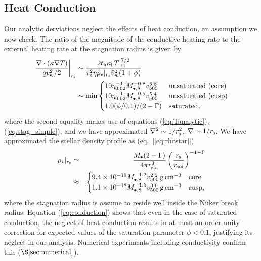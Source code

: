 \documentclass[usenatbib,fleqn]{mn2e}
\begin{document}
\subsection{Heat Conduction}
\label{sec:conductivity}

Our analytic derviations neglect the effects of heat conduction, an assumption we now check.  The ratio of the magnitude of the conductive heating rate to the external heating rate at the stagnation radius is given by
\begin{align}
  \left.\frac{\nabla\cdot(\kappa \nabla T)}{q v_{\rm
w}^{2}/2}\right|_{r_{\rm s}} &\sim \frac{2t_{\rm h}\kappa_0
T|_{r_{\rm s}}^{7/2}}{r_{\rm s}^{2}\eta \rho_{\star}|_{r_{\rm s}} \tilde{v}_{w}^{2}(1+\phi)}
\nonumber \\ &\sim {\rm min}
  \begin{cases}
  10 \eta_{0.02}^{-1}
M_{\bullet,8}^{-0.8} v_{500}^{6.8} &  \text{unsaturated (core)}\\
 10 \eta_{0.02}^{-1}
M_{\bullet,8}^{-0.5} v_{500}^{5.4} &  \text{unsaturated (cusp)}\\
  1.0(\phi/0.1)/(2-\Gamma) & \text{saturated},
  \end{cases}
 \label{eq:conduction}
\end{align}
where the second equality makes use of equations (\ref{eq:Tanalytic}), (\ref{eq:stag_simple}), and we have approximated $\nabla^{2} \sim 1/r_{\rm s}^{2}$, $\nabla \sim 1/r_{\rm s}$.  We have approximated the stellar density profile as (eq.~[\ref{eq:rhostar}])
\begin{eqnarray}
  \rho_{\star}|_{r_{\rm s}} &\simeq& \frac{M_{\bullet}(2-\Gamma)}{4\pi r_{\rm soi}^{3}}\left(\frac{r_{\rm s}}{r_{\rm soi}}\right)^{-1-\Gamma} \nonumber \\
 &\approx& \begin{cases}
    9.4 \times 10^{-19}M_{\bullet,8}^{-1.2}v_{500}^{2.2}\,{\rm g\,cm^{-3}}
    & \text{core} \\
    1.1 \times 10^{-18} M_{\bullet,8}^{-1.5}v_{500}^{3.6}
    \,{\rm g\,cm^{-3}}  & \text{cusp}, 
  \end{cases}
  \label{eq:rhostarrs}
\end{eqnarray}
where the stagnation radius is assume to reside well inside the Nuker break radius.  Equation (\ref{eq:conduction}) shows that even in the case of saturated conduction, the neglect of heat conduction results in at most an order unity correction for expected values of the saturation parameter $\phi < 0.1$, justifying its neglect in our analysis.  Numerical experiments including conductivity confirm this ($\S\ref{sec:numerical}$). 
\end{document}
